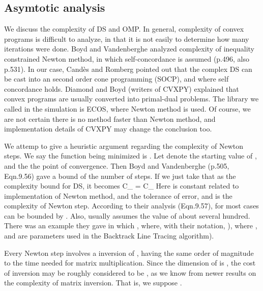 \subsection {Asymtotic analysis}

We discuss the complexity of DS and OMP.
In general, complexity of convex programs is difficult to analyze, in that it is not easily to determine how many iterations were done.
Boyd and Vandenberghe \cite {BoV04} analyzed complexity of inequality constrained Newton method, in which self-concordance is assumed (p.496, also p.531).
In our case, Candès and Romberg \cite {CaR05} pointed out that the complex DS can be cast into an second order cone programming (SOCP), and where self concordance holds.
Diamond and Boyd (writers of CVXPY) \cite {DiB16} explained that convex programs are usually converted into primal-dual problems.
The library we called in the simulation is ECOS, where Newton method is used.
Of course, we are not certain there is no method faster than Newton method, and implementation details of CVXPY may change the conclusion too.

We attemp to give a heuristic argument regarding the complexity of Newton steps.
We say the function being minimized is .
Let  denote the starting value of , and  the the point of convergence.
Then Boyd and Vandenberghe \cite {BoV04} (p.505, Eqn.9.56) gave a bound of the number of steps.
If we just take that as the complexity bound for DS, it becomes
%
 {
C_{}
=  C_{} \NR
}
%
Here  is constant related to implementation of Newton method, and \m {\e} the tolerance of error, and  is the complexity of Newton step.
According to their analysis (Eqn.9.57), for most cases \m {-\log_2 \log_2 \e} can be bounded by .
Also,  usually assumes the value of about several hundred.
There was an example they gave in which , where, with their notation,
), where , and \m {\a, \b} are parameters used in the Backtrack Line Tracing algorithm).

Every Newton step involves a inversion of , having the same order of magnitude to the time needed for matrix multiplication.
Since the dimension of  is , the cost of inversion may be roughly considered to be , as we know from newer results on the complexity of matrix inversion.
That is, we suppose .


